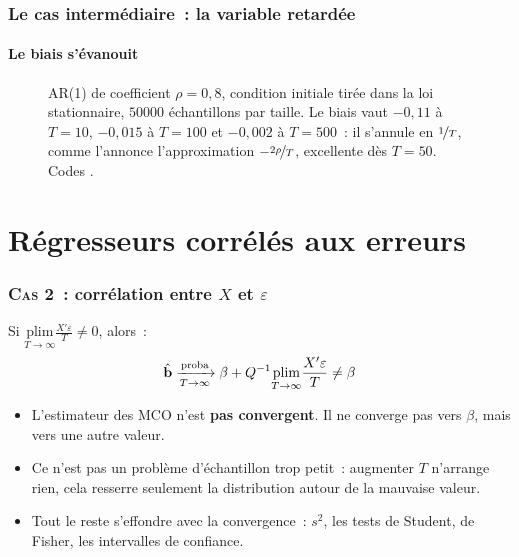 \documentclass[10pt]{beamer}
\begin{document}
\begin{frame}[c]
  \frametitle{Le cas intermédiaire~: la variable retardée}
  \framesubtitle{Le biais s'évanouit}

  \begin{figure}
    \centering
    \scalebox{.42}{}
    \caption{AR(1) de coefficient $\rho=0{,}8$, condition initiale tirée dans la
      loi stationnaire, $50000$ échantillons par taille. Le biais vaut $-0{,}11$
      à $T=10$, $-0{,}015$ à $T=100$ et $-0{,}002$ à $T=500$~: il s'annule en
      $\nicefrac{1}{T}$, comme l'annonce l'approximation $-\nicefrac{2\rho}{T}$,
      excellente dès $T=50$. Codes .}
  \end{figure}

\end{frame}


\section{Régresseurs corrélés aux erreurs}

\begin{frame}
  \frametitle{\textsc{Cas 2~:} corrélation entre $X$ et $\varepsilon$}

  \begin{prop}\label{prop:inconvergence}
    Si $\underset{T\rightarrow\infty}{\text{plim}}\frac{X'\varepsilon}{T} \neq 0$, alors~:
    \[
      \hat{\mathbf b} \xrightarrow[T\rightarrow\infty]{\text{proba}} \beta + Q^{-1}\underset{T\rightarrow\infty}{\text{plim}}\frac{X'\varepsilon}{T} \neq \beta
    \]
  \end{prop}

  \bigskip

  \begin{itemize}

  \item[$\Rightarrow$] L'estimateur des MCO n'est \textbf{pas convergent}. Il ne
    converge pas vers $\beta$, mais vers une autre valeur.\newline

  \item[\dbend] Ce n'est pas un problème d'échantillon trop petit~: augmenter $T$
    n'arrange rien, cela resserre seulement la distribution autour de la
    mauvaise valeur.\newline

  \item Tout le reste s'effondre avec la convergence~: $s^2$, les tests de
    Student, de Fisher, les intervalles de confiance.

  \end{itemize}

\end{frame}
\end{document}
